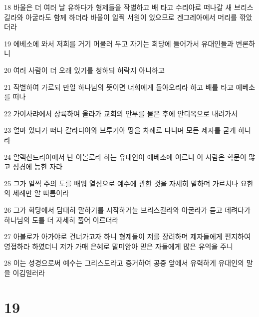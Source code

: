 \par 18 바울은 더 여러 날 유하다가 형제들을 작별하고 배 타고 수리아로 떠나갈 새 브리스길라와 아굴라도 함께 하더라 바울이 일찍 서원이 있으므로 겐그레아에서 머리를 깎았더라
\par 19 에베소에 와서 저희를 거기 머물러 두고 자기는 회당에 들어가서 유대인들과 변론하니
\par 20 여러 사람이 더 오래 있기를 청하되 허락지 아니하고
\par 21 작별하여 가로되 만일 하나님의 뜻이면 너희에게 돌아오리라 하고 배를 타고 에베소를 떠나
\par 22 가이사랴에서 상륙하여 올라가 교회의 안부를 물은 후에 안디옥으로 내려가서
\par 23 얼마 있다가 떠나 갈라디아와 브루기아 땅을 차례로 다니며 모든 제자를 굳게 하니라
\par 24 알렉산드리아에서 난 아볼로라 하는 유대인이 에베소에 이르니 이 사람은 학문이 많고 성경에 능한 자라
\par 25 그가 일찍 주의 도를 배워 열심으로 예수에 관한 것을 자세히 말하며 가르치나 요한의 세례만 알 따름이라
\par 26 그가 회당에서 담대히 말하기를 시작하거늘 브리스길라와 아굴라가 듣고 데려다가 하나님의 도를 더 자세히 풀어 이르더라
\par 27 아볼로가 아가야로 건너가고자 하니 형제들이 저를 장려하며 제자들에게 편지하여 영접하라 하였더니 저가 가매 은혜로 말미암아 믿은 자들에게 많은 유익을 주니
\par 28 이는 성경으로써 예수는 그리스도라고 증거하여 공중 앞에서 유력하게 유대인의 말을 이김일러라

\chapter{19}

